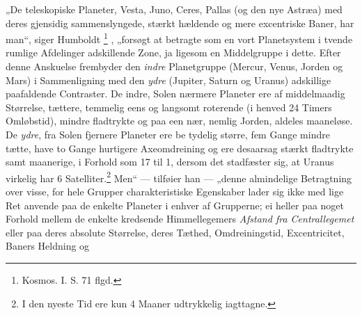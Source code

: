\documentclass[12pt,a4paper]{book}
\renewcommand{\thefootnote}{*)}
\begin{document}
„De teleskopiske Planeter, Vesta, Juno, Ceres, Pallas (og den nye
Astræa) med deres gjensidig sammenslyngede, stærkt hældende og mere
excentriske Baner, har man“, siger Humboldt%
\renewcommand{\thefootnote}{**)}%
\footnote{%
Kosmos. I. S. 71 flgd.}%
\renewcommand{\thefootnote}{*)}%
, „forsøgt at betragte som en vort Planetsystem i tvende rumlige
Afdelinger adskillende Zone, ja ligesom en Middelgruppe i dette. Efter
denne Anskuelse frembyder den \emph{indre} Planetgruppe (Mercur, Venus,
Jorden og Mars) i Sammenligning med den \emph{ydre} (Jupiter, Saturn og
Uranus) adskillige paafaldende Contraster. De indre, Solen nærmere
Planeter ere af middelmaadig Størrelse, tættere, temmelig eens og
langsomt roterende (i henved 24 Timers Omløbstid), mindre fladtrykte og
paa een nær, nemlig Jorden, aldeles maaneløse. De \emph{ydre}, fra
Solen fjernere Planeter ere be\-%
tydelig større, fem Gange mindre tætte, have to Gange hurtigere
Axeomdreining og ere desaarsag stærkt fladtrykte samt maanerige, i
Forhold som 17 til 1, dersom det stadfæster sig, at Uranus virkelig har
6 Satelliter.\footnote{%
I den nyeste Tid ere kun 4 Maaner udtrykkelig iagttagne.}
Men“ --- tilføier han --- „denne almindelige Betragtning over visse, for
hele Grupper charakteristiske Egenskaber lader sig ikke med lige Ret
anvende paa de enkelte Planeter i enhver af Grupperne; ei heller paa
noget Forhold mellem de enkelte kredsende Himmellegemers
\emph{Afstand fra Centrallegemet} eller paa deres absolute Størrelse,
deres Tæthed, Omdreiningstid, Excentricitet, Baners Heldning og
\end{document}
